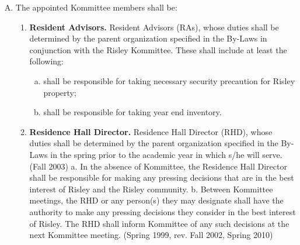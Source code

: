 \documentclass[12pt]{article}
\begin{document}
\begin{enumerate}[A.]
\begin{enumerate}[A.]
\item The appointed Kommittee members shall be:
\begin{enumerate}[1.]
\item \textbf{Resident Advisors.} Resident Advisors (RAs), whose duties shall be determined by the parent organization specified in the By-Laws in conjunction with the Risley Kommittee. These shall include at least the following:
\begin{enumerate}[a.]
\item shall be responsible for taking necessary security precaution for Risley property;
\item shall be responsible for taking year end inventory.
\end{enumerate}
\item \textbf{Residence Hall Director.} Residence Hall Director (RHD), whose duties shall be determined by the parent organization specified in the By-Laws in the spring prior to the academic year in which s/he will serve. (Fall 2003) a. In the absence of Kommittee, the Residence Hall Director shall be responsible for making any pressing decisions that are in the best interest of Risley and the Risley community. b. Between Kommittee meetings, the RHD or any person(s) they may designate shall have the authority to make any pressing decisions they consider in the best interest of Risley. The RHD shall inform Kommittee of any such decisions at the next Kommittee meeting. (Spring 1999, rev. Fall 2002, Spring 2010)


\end{enumerate}
\end{enumerate}
\end{enumerate}
\end{document}
